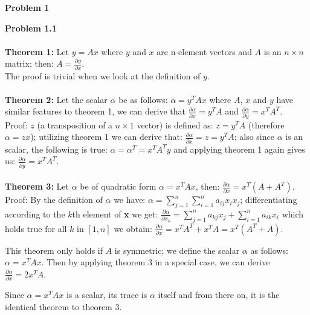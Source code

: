 \documentclass{article}
\newenvironment{problem}[2][Problem]
    { \begin{mdframed}[backgroundcolor=gray!20] \textbf{#1 #2} \\}
    {  \end{mdframed}}
\begin{document}
    \begin{problem}{1}
        \begin{problem}{1.1}
                \\
                \textbf{Theorem 1:} Let $y=Ax$ where $y$ and $x$ are n-element vectors and $A$ is an $n \times n$ matrix; then: $A=\frac{\partial y}{\partial x}$.
                \\ The proof is trivial when we look at the definition of $y$.
                \\ \\ \textbf{Theorem 2:} Let the scalar $\alpha$ be as follows: $\alpha = y^T A x$ where $A$, $x$ and $y$ have similar features to theorem 1,
                we can derive that $\frac{\partial \alpha}{\partial x}= y^T A$ and $\frac{\partial \alpha}{\partial y}= x^T A^T$. \\
                Proof: $z$ (a transposition of a $n\times 1$ vector) is defined as: $z=y^T A$ (therefore $\alpha = z x$); utilizing theorem 1 we can
                derive that: $\frac{\partial\alpha}{\partial x}= z= y^T A$; also since $\alpha$ is an scalar, the following is true: $\alpha = \alpha^T= x^T A^T y$ and applying theorem
                1 again gives us: $\frac{\partial\alpha}{\partial y}= x^T A^T$.
                \\ \\ \textbf{Theorem 3:} Let $\alpha$ be of quadratic form $\alpha = x^T A x$, then: $\frac{\partial\alpha}{\partial x} = x^T(A+A^T)$.
                \\Proof: By the definition of $\alpha$ we have: $\alpha = \displaystyle\sum_{j=1}^n\sum_{i=1}^n a_{ij}x_i x_j$; differentiating according 
                to the $k$th element of \textbf{x} we get: $\frac{\partial\alpha}{\partial x_k}= \displaystyle\sum_{j=1}^n a_{kj}x_j + \sum_{i=1}^n a_{ik}x_i$ which
                holds true for all $k$ in $[1,n]$ we obtain: $\frac{\partial\alpha}{\partial x}= x^T A^T + x^T A = x^T(A^T+A)$.
            
            \begin{section}{}
                \noindent
                This theorem only holds if $A$ is symmetric; we define the scalar $\alpha$ as follows: $\alpha= x^TAx$. Then by applying theorem 3
                in a special case, we can derive $\frac{\partial\alpha}{\partial x}=2x^TA$.
            \end{section}
            \begin{section}{}
                \noindent
                Since $\alpha=x^TAx$ is a scalar, its trace is $\alpha$ itself and from there on, it is the identical theorem to theorem 3.
            \end{section}
        \end{problem}


\end{problem}
\end{document}
